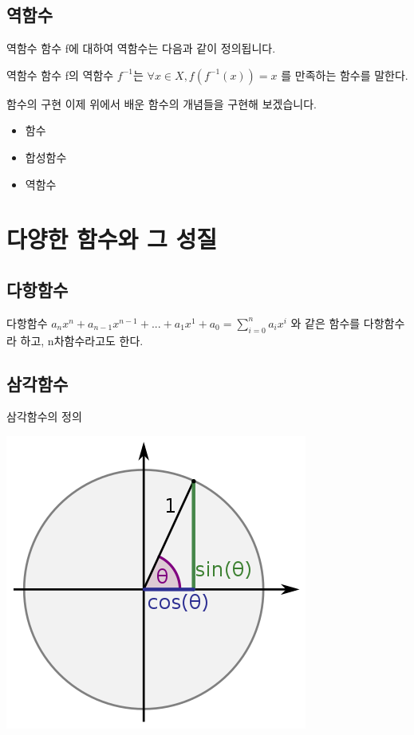 \documentclass{beamer}
\begin{document}
\subsection{역함수}
\begin{frame}{역함수}
함수 f에 대하여 역함수는 다음과 같이 정의됩니다. 
\begin{block}{역함수}
함수 f의 역함수 $f^{-1}$는 $\forall x \in X, f(f^{-1}(x)) = x$ 를 만족하는 함수를 말한다. 
\end{block}
\end{frame}

\begin{frame}{함수의 구현}
이제 위에서 배운 함수의 개념들을 구현해 보겠습니다. 
\begin{itemize}
\item 함수 
\item 합성함수
\item 역함수 
\end{itemize}
\end{frame}

\section{다양한 함수와 그 성질} 

\subsection{다항함수}

\begin{frame}{다항함수}
$a_nx^n + a_{n-1}x^{n-1} + ... + a_1 x^1 + a_0 = \sum^{n}_{i=0} a_i x^i$
와 같은 함수를 다항함수라 하고, n차함수라고도 한다. 
\end{frame}

\subsection{삼각함수} 
\begin{frame}{삼각함수의 정의}
\begin{centering}
\includegraphics[height = 0.8\textheight]{trigo}
\end{centering}
\end{frame}
\end{document}
